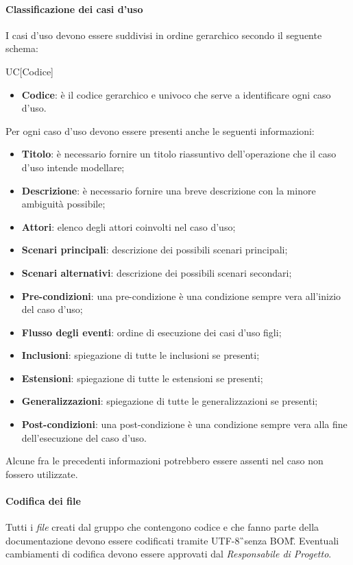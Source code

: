 \paragraph{Classificazione dei casi d'uso}
I casi d'uso devono essere suddivisi in ordine gerarchico secondo il seguente schema:
\begin{center}
	UC[Codice]
\end{center}

	\begin{itemize}
		\item \textbf{Codice}: è il codice gerarchico e univoco che serve a identificare ogni caso d'uso.
	\end{itemize}
Per ogni caso d'uso devono essere presenti anche le seguenti informazioni:
	\begin{itemize}
		\item \textbf{Titolo}: è necessario fornire un titolo riassuntivo dell'operazione che il caso d'uso intende modellare;
		\item \textbf{Descrizione}: è necessario fornire una breve descrizione con la minore ambiguità possibile;
		\item \textbf{Attori}: elenco degli attori coinvolti nel caso d'uso;
		\item \textbf{Scenari principali}: descrizione dei possibili scenari principali;
		\item \textbf{Scenari alternativi}: descrizione dei possibili scenari secondari;
		\item \textbf{Pre-condizioni}: una pre-condizione è una condizione sempre vera all'inizio del caso d'uso;
		\item \textbf{Flusso degli eventi}: ordine di esecuzione dei casi d'uso figli;
		\item \textbf{Inclusioni}: spiegazione di tutte le inclusioni se presenti;
		\item \textbf{Estensioni}: spiegazione di tutte le estensioni se presenti;
		\item \textbf{Generalizzazioni}: spiegazione di tutte le generalizzazioni se presenti;
		\item \textbf{Post-condizioni}: una post-condizione è una condizione sempre vera alla fine dell'esecuzione del caso d'uso.
	\end{itemize}
Alcune fra le precedenti informazioni potrebbero essere assenti nel caso non fossero utilizzate.

\paragraph{Codifica dei file}
Tutti i \textit{file} creati dal gruppo che contengono codice e che fanno parte della documentazione devono essere codificati tramite UTF-8\G\ senza BOM\G. Eventuali cambiamenti di codifica devono essere approvati dal \textit{Responsabile di Progetto}.
